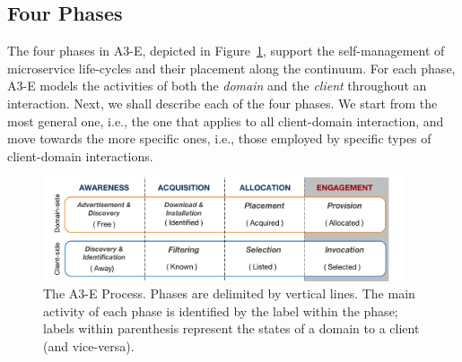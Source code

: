 
\subsection{Four Phases}

The four phases in A3-E, depicted in Figure~\ref{fig:A3-E-process}, support the self-management of microservice life-cycles and their placement along the continuum. For each phase, A3-E models the activities of both the \textit{domain} and the \textit{client} throughout an interaction. Next, we shall describe each of the four phases. We start from the most general one, i.e., the one that applies to all client-domain interaction, and move towards the more specific ones, i.e., those employed by specific types of client-domain interactions. 


\begin{figure}[tbp]
	\includegraphics[width=0.95\textwidth]{figs/A3-E-process}
	\caption{The A3-E Process. Phases are delimited by vertical lines. The main activity of each phase is identified by the label within the phase; labels within parenthesis represent the states of a domain to a client (and vice-versa).}
	\label{fig:A3-E-process}
\end{figure}



